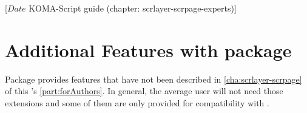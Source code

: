 %
%
%
%
%
%
%
%
% 
%
%
%
%

%
                 [$Date$
                  KOMA-Script guide (chapter: scrlayer-scrpage-experts)]


\chapter[{Additional Features of \Package{scrlayer-scrpage}}]
  {Additional Features with
    package }
%
\BeginIndexGroup
{}%
Package  provides features that have not been
described in \autoref{cha:scrlayer-scrpage} of this 's \autoref{part:forAuthors}. In general, the average user will
not need those extensions and some of them are only provided for
compatibility with .

